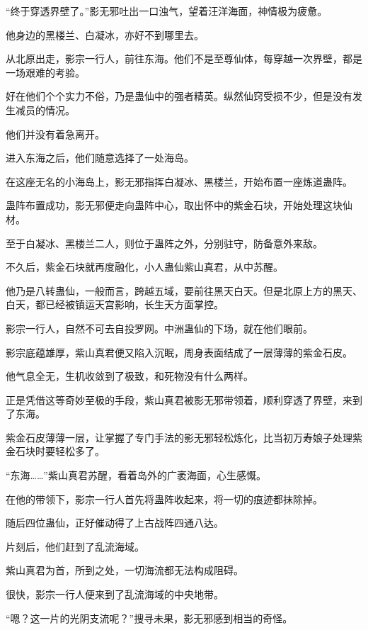 
\begin{this_body}



“终于穿透界壁了。”影无邪吐出一口浊气，望着汪洋海面，神情极为疲惫。

他身边的黑楼兰、白凝冰，亦好不到哪里去。

从北原出走，影宗一行人，前往东海。他们不是至尊仙体，每穿越一次界壁，都是一场艰难的考验。

好在他们个个实力不俗，乃是蛊仙中的强者精英。纵然仙窍受损不少，但是没有发生减员的情况。

他们并没有着急离开。

进入东海之后，他们随意选择了一处海岛。

在这座无名的小海岛上，影无邪指挥白凝冰、黑楼兰，开始布置一座炼道蛊阵。

蛊阵布置成功，影无邪便走向蛊阵中心，取出怀中的紫金石块，开始处理这块仙材。

至于白凝冰、黑楼兰二人，则位于蛊阵之外，分别驻守，防备意外来敌。

不久后，紫金石块就再度融化，小人蛊仙紫山真君，从中苏醒。

他乃是八转蛊仙，一般而言，跨越五域，要前往黑天白天。但是北原上方的黑天、白天，都已经被镇运天宫影响，长生天方面掌控。

影宗一行人，自然不可去自投罗网。中洲蛊仙的下场，就在他们眼前。

影宗底蕴雄厚，紫山真君便又陷入沉眠，周身表面结成了一层薄薄的紫金石皮。

他气息全无，生机收敛到了极致，和死物没有什么两样。

正是凭借这等奇妙至极的手段，紫山真君被影无邪带领着，顺利穿透了界壁，来到了东海。

紫金石皮薄薄一层，让掌握了专门手法的影无邪轻松炼化，比当初万寿娘子处理紫金石块时要轻松多了。

“东海……”紫山真君苏醒，看着岛外的广袤海面，心生感慨。

在他的带领下，影宗一行人首先将蛊阵收起来，将一切的痕迹都抹除掉。

随后四位蛊仙，正好催动得了上古战阵四通八达。

片刻后，他们赶到了乱流海域。

紫山真君为首，所到之处，一切海流都无法构成阻碍。

很快，影宗一行人便来到了乱流海域的中央地带。

“嗯？这一片的光阴支流呢？”搜寻未果，影无邪感到相当的奇怪。


\end{this_body}
